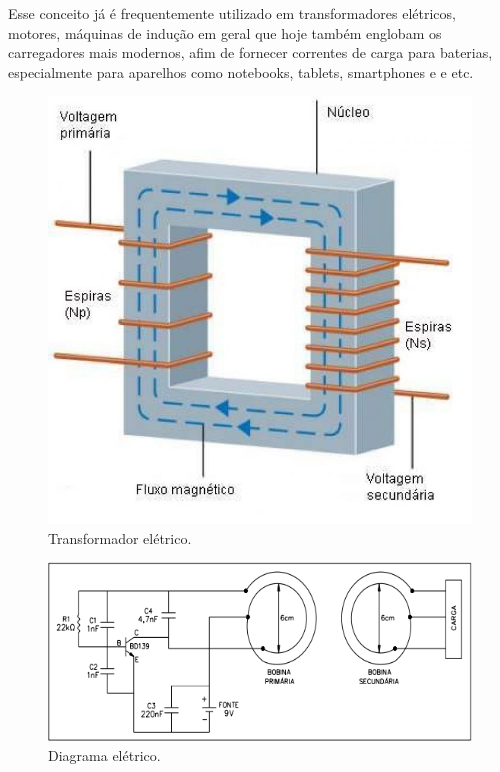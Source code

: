 Esse conceito já é frequentemente utilizado em transformadores elétricos, motores, máquinas de indução em geral que hoje também englobam os carregadores mais modernos, afim de fornecer correntes de carga para baterias, especialmente para aparelhos como notebooks, tablets, smartphones e  e etc.

 \begin{figure}[H]
	\centering
	\includegraphics[scale=0.5]{figuras/transformador}
	\caption{Transformador elétrico.}
	\label{img:transformador}
\end{figure}

 \begin{figure}[H]
	\centering
	\includegraphics[scale=0.5]{figuras/diagrama_eletrico}
	\caption{Diagrama elétrico.}
	\label{img:diagrama_eletrico}
\end{figure}

